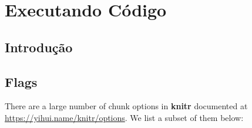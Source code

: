 \documentclass[
]{book}
\begin{document}
\hypertarget{executando-cuxf3digo}{%
\chapter{Executando Código}\label{executando-cuxf3digo}}

\hypertarget{introduuxe7uxe3o}{%
\section{Introdução}\label{introduuxe7uxe3o}}

\hypertarget{flags}{%
\section{Flags}\label{flags}}

There are a large number of chunk options in \textbf{knitr} documented at \url{https://yihui.name/knitr/options}. We list a subset of them below:
\end{document}
